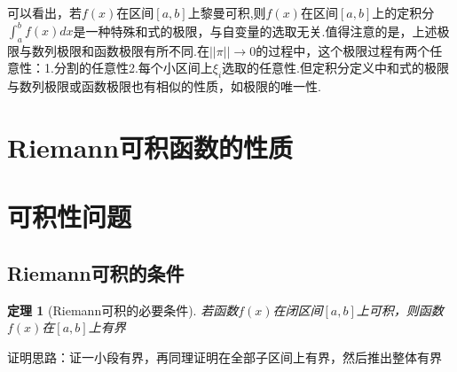 \documentclass[12pt, a4paper, oneside]{ctexart}
\newtheorem{theorem}{定理}[section]
\begin{document}
\begin{remark}
可以看出，若$f(x)$在区间$[a,b]$上黎曼可积,则$f(x)$在区间$[a,b]$上的定积分$\int_{a}^{b}f(x)dx$是一种特殊和式的极限，与自变量的选取无关.值得注意的是，上述极限与数列极限和函数极限有所不同.在$||\pi|| \to 0 $的过程中，这个极限过程有两个任意性：1.分割的任意性2.每个小区间上$\xi_i$选取的任意性.但定积分定义中和式的极限与数列极限或函数极限也有相似的性质，如极限的唯一性.
\end{remark}


\section{Riemann可积函数的性质}


\section{可积性问题}

\subsection{Riemann可积的条件}

\begin{theorem}[Riemann可积的必要条件]
若函数$f(x)$在闭区间$[a,b]$上可积，则函数$f(x)$在$[a,b]$上有界
\end{theorem}

\begin{note}
证明思路：证一小段有界，再同理证明在全部子区间上有界，然后推出整体有界
\end{note}
\end{document}
